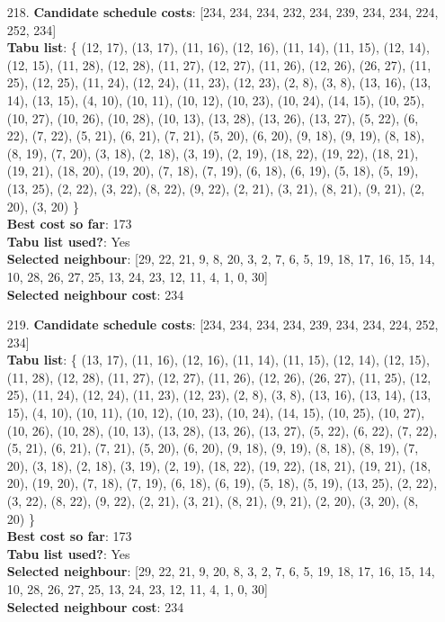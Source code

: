 \documentclass[fleqn]{article}
\begin{document}
\begin{itemize}
    \item[218.] \textbf{Candidate schedule costs}: [234, 234, 234, 232, 234, 239, 234, 234, 224, 252, 234] \\
    \textbf{Tabu list}: \{ (12, 17), (13, 17), (11, 16), (12, 16), (11, 14), (11, 15), (12, 14), (12, 15), (11, 28), (12, 28), (11, 27), (12, 27), (11, 26), (12, 26), (26, 27), (11, 25), (12, 25), (11, 24), (12, 24), (11, 23), (12, 23), (2, 8), (3, 8), (13, 16), (13, 14), (13, 15), (4, 10), (10, 11), (10, 12), (10, 23), (10, 24), (14, 15), (10, 25), (10, 27), (10, 26), (10, 28), (10, 13), (13, 28), (13, 26), (13, 27), (5, 22), (6, 22), (7, 22), (5, 21), (6, 21), (7, 21), (5, 20), (6, 20), (9, 18), (9, 19), (8, 18), (8, 19), (7, 20), (3, 18), (2, 18), (3, 19), (2, 19), (18, 22), (19, 22), (18, 21), (19, 21), (18, 20), (19, 20), (7, 18), (7, 19), (6, 18), (6, 19), (5, 18), (5, 19), (13, 25), (2, 22), (3, 22), (8, 22), (9, 22), (2, 21), (3, 21), (8, 21), (9, 21), (2, 20), (3, 20) \} \\
    \textbf{Best cost so far}: 173 \\
    \textbf{Tabu list used?}: Yes \\
    \textbf{Selected neighbour}: [29, 22, 21, 9, 8, 20, 3, 2, 7, 6, 5, 19, 18, 17, 16, 15, 14, 10, 28, 26, 27, 25, 13, 24, 23, 12, 11, 4, 1, 0, 30] \\
    \textbf{Selected neighbour cost}: 234
      

    \item[219.] \textbf{Candidate schedule costs}: [234, 234, 234, 234, 239, 234, 234, 224, 252, 234] \\
    \textbf{Tabu list}: \{ (13, 17), (11, 16), (12, 16), (11, 14), (11, 15), (12, 14), (12, 15), (11, 28), (12, 28), (11, 27), (12, 27), (11, 26), (12, 26), (26, 27), (11, 25), (12, 25), (11, 24), (12, 24), (11, 23), (12, 23), (2, 8), (3, 8), (13, 16), (13, 14), (13, 15), (4, 10), (10, 11), (10, 12), (10, 23), (10, 24), (14, 15), (10, 25), (10, 27), (10, 26), (10, 28), (10, 13), (13, 28), (13, 26), (13, 27), (5, 22), (6, 22), (7, 22), (5, 21), (6, 21), (7, 21), (5, 20), (6, 20), (9, 18), (9, 19), (8, 18), (8, 19), (7, 20), (3, 18), (2, 18), (3, 19), (2, 19), (18, 22), (19, 22), (18, 21), (19, 21), (18, 20), (19, 20), (7, 18), (7, 19), (6, 18), (6, 19), (5, 18), (5, 19), (13, 25), (2, 22), (3, 22), (8, 22), (9, 22), (2, 21), (3, 21), (8, 21), (9, 21), (2, 20), (3, 20), (8, 20) \} \\
    \textbf{Best cost so far}: 173 \\
    \textbf{Tabu list used?}: Yes \\
    \textbf{Selected neighbour}: [29, 22, 21, 9, 20, 8, 3, 2, 7, 6, 5, 19, 18, 17, 16, 15, 14, 10, 28, 26, 27, 25, 13, 24, 23, 12, 11, 4, 1, 0, 30] \\
    \textbf{Selected neighbour cost}: 234
      


\end{itemize}
\end{document}
